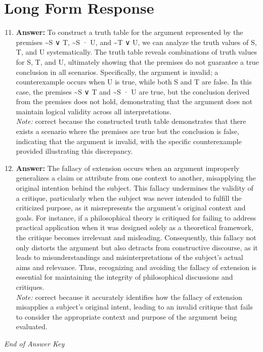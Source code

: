 \documentclass[12pt]{article}
\begin{document}
\section*{Long Form Response}
\begin{enumerate}[label=\arabic*.]
\setcounter{enumi}{10}
\item \textbf{Answer:} To construct a truth table for the argument represented by the premises \textasciitilde{}S ∨ T, \textasciitilde{}S · U, and \textasciitilde{}T ∨ U, we can analyze the truth values of S, T, and U systematically. The truth table reveals combinations of truth values for S, T, and U, ultimately showing that the premises do not guarantee a true conclusion in all scenarios. Specifically, the argument is invalid; a counterexample occurs when U is true, while both S and T are false. In this case, the premises \textasciitilde{}S ∨ T and \textasciitilde{}S · U are true, but the conclusion derived from the premises does not hold, demonstrating that the argument does not maintain logical validity across all interpretations.
\\ \textit{Note:} correct because the constructed truth table demonstrates that there exists a scenario where the premises are true but the conclusion is false, indicating that the argument is invalid, with the specific counterexample provided illustrating this discrepancy.
\item \textbf{Answer:} The fallacy of extension occurs when an argument improperly generalizes a claim or attribute from one context to another, misapplying the original intention behind the subject. This fallacy undermines the validity of a critique, particularly when the subject was never intended to fulfill the criticized purpose, as it misrepresents the argument's original context and goals. For instance, if a philosophical theory is critiqued for failing to address practical application when it was designed solely as a theoretical framework, the critique becomes irrelevant and misleading. Consequently, this fallacy not only distorts the argument but also detracts from constructive discourse, as it leads to misunderstandings and misinterpretations of the subject's actual aims and relevance. Thus, recognizing and avoiding the fallacy of extension is essential for maintaining the integrity of philosophical discussions and critiques.
\\ \textit{Note:} correct because it accurately identifies how the fallacy of extension misapplies a subject's original intent, leading to an invalid critique that fails to consider the appropriate context and purpose of the argument being evaluated.
\end{enumerate}

\vfill
\noindent\textit{End of Answer Key}
\end{document}
